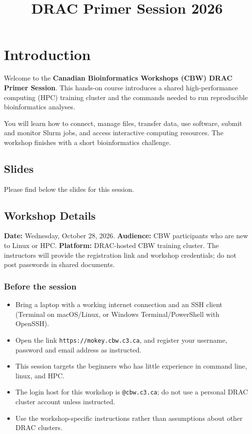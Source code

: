 \documentclass[
]{book}
\title{DRAC Primer Session 2026}
\author{}
\date{\vspace{-2.5em}}
\providecommand{\tightlist}{%
  \setlength{\itemsep}{0pt}\setlength{\parskip}{0pt}}
\begin{document}
\maketitle

{
\setcounter{tocdepth}{1}
\tableofcontents
}
\chapter*{Introduction}\label{introduction}

Welcome to the \textbf{Canadian Bioinformatics Workshops (CBW) DRAC Primer Session}. This hands-on course introduces a shared high-performance computing (HPC) training cluster and the commands needed to run reproducible bioinformatics analyses.

You will learn how to connect, manage files, transfer data, use software, submit and monitor Slurm jobs, and access interactive computing resources. The workshop finishes with a short bioinformatics challenge.

\section*{Slides}\label{slides}

Please find below the slides for this session.

\section*{Workshop Details}\label{workshop-details}

\textbf{Date:} Wednesday, October 28, 2026.
\textbf{Audience:} CBW participants who are new to Linux or HPC.
\textbf{Platform:} DRAC-hosted CBW training cluster. The instructors will provide the registration link and workshop credentials; do not post passwords in shared documents.

\subsection*{Before the session}\label{before-the-session}

\begin{itemize}
\tightlist
\item
  Bring a laptop with a working internet connection and an SSH client (Terminal on macOS/Linux, or Windows Terminal/PowerShell with OpenSSH).
\item
  Open the link \texttt{https://mokey.cbw.c3.ca}, and register your username, password and email address as instructed.
\item
  This session targets the beginners who has little experience in command line, linux, and HPC.
\item
  The login host for this workshop is \texttt{@cbw.c3.ca}; do not use a personal DRAC cluster account unless instructed.
\item
  Use the workshop-specific instructions rather than assumptions about other DRAC clusters.
\end{itemize}
\end{document}
